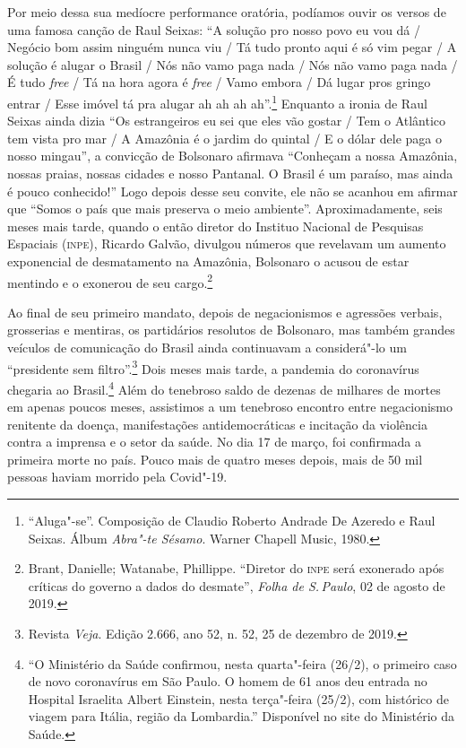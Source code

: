 Por meio dessa sua medíocre performance oratória, podíamos ouvir os
versos de uma famosa canção de Raul Seixas: ``A solução pro nosso povo
eu vou dá / Negócio bom assim ninguém nunca viu / Tá tudo pronto aqui é
só vim pegar / A solução é alugar o Brasil / Nós não vamo paga nada /
Nós não vamo paga nada / É tudo \emph{free} / Tá na hora agora é
\emph{free} / Vamo embora / Dá lugar pros gringo entrar / Esse imóvel tá
pra alugar ah ah ah ah''.\footnote{``Aluga"-se''. Composição de Claudio
  Roberto Andrade De Azeredo e Raul Seixas. Álbum \emph{Abra"-te Sésamo}.
  Warner Chapell Music, 1980.} Enquanto a ironia de Raul Seixas ainda
dizia ``Os estrangeiros eu sei que eles vão gostar / Tem o Atlântico tem
vista pro mar / A Amazônia é o jardim do quintal / E o dólar dele paga o
nosso mingau'', a convicção de Bolsonaro afirmava ``Conheçam a nossa
Amazônia, nossas praias, nossas cidades e nosso Pantanal. O Brasil é um
paraíso, mas ainda é pouco conhecido!'' Logo depois desse seu
convite, ele não se acanhou em afirmar que ``Somos o país que mais
preserva o meio ambiente''. Aproximadamente, seis meses mais tarde,
quando o então diretor do Instituo Nacional de Pesquisas Espaciais
(\textsc{inpe}), Ricardo Galvão, divulgou números que revelavam um aumento
exponencial de desmatamento na Amazônia, Bolsonaro o acusou de estar
mentindo e o exonerou de seu cargo.\footnote{Brant, Danielle; Watanabe,
  Phillippe. ``Diretor do \textsc{inpe} será exonerado após críticas do governo a
  dados do desmate'', \textit{Folha de S.\,Paulo}, 02 de agosto de 2019.}

Ao final de seu primeiro mandato, depois de negacionismos e agressões
verbais, grosserias e mentiras, os partidários resolutos de Bolsonaro,
mas também grandes veículos de comunicação do Brasil ainda continuavam a
considerá"-lo um ``presidente sem filtro''.\footnote{Revista \emph{Veja}.
  Edição 2.666, ano 52, n. 52, 25 de dezembro de 2019.} Dois meses mais
tarde, a pandemia do coronavírus chegaria ao Brasil.\footnote{``O
  Ministério da Saúde confirmou, nesta quarta"-feira (26/2), o primeiro
  caso de novo coronavírus em São Paulo. O homem de 61 anos deu entrada
  no Hospital Israelita Albert Einstein, nesta terça"-feira (25/2), com
  histórico de viagem para Itália, região da Lombardia.'' Disponível no site do Ministério da Saúde.}
Além do tenebroso saldo de dezenas de milhares de mortes em apenas
poucos meses, assistimos a um tenebroso encontro entre negacionismo
renitente da doença, manifestações antidemocráticas e incitação da
violência contra a imprensa e o setor da saúde. No dia 17 de março, foi
confirmada a primeira morte no país. Pouco mais de quatro meses depois,
mais de 50 mil pessoas haviam morrido pela Covid"-19.

